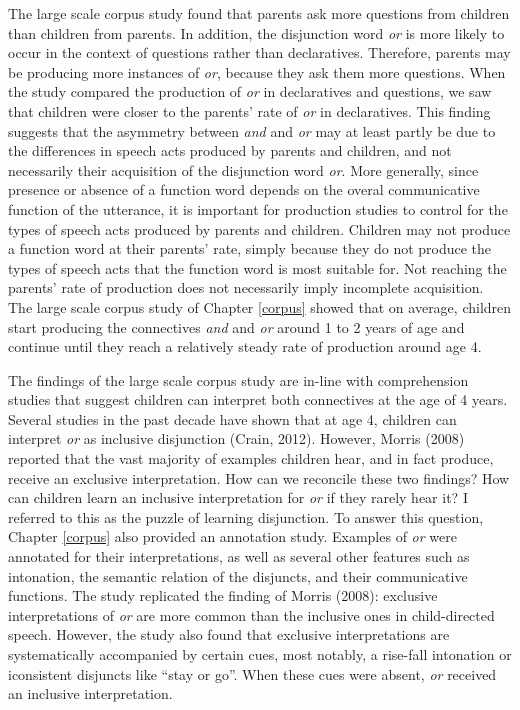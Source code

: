 \documentclass[oneside]{report}
\theoremstyle{definition}
\theoremstyle{definition}
\theoremstyle{definition}
\theoremstyle{remark}
\begin{document}
The large scale corpus study found that parents ask more questions from
children than children from parents. In addition, the disjunction word
\emph{or} is more likely to occur in the context of questions rather
than declaratives. Therefore, parents may be producing more instances of
\emph{or}, because they ask them more questions. When the study compared
the production of \emph{or} in declaratives and questions, we saw that
children were closer to the parents' rate of \emph{or} in declaratives.
This finding suggests that the asymmetry between \emph{and} and
\emph{or} may at least partly be due to the differences in speech acts
produced by parents and children, and not necessarily their acquisition
of the disjunction word \emph{or}. More generally, since presence or
absence of a function word depends on the overal communicative function
of the utterance, it is important for production studies to control for
the types of speech acts produced by parents and children. Children may
not produce a function word at their parents' rate, simply because they
do not produce the types of speech acts that the function word is most
suitable for. Not reaching the parents' rate of production does not
necessarily imply incomplete acquisition. The large scale corpus study
of Chapter \ref{corpus} showed that on average, children start producing
the connectives \emph{and} and \emph{or} around 1 to 2 years of age and
continue until they reach a relatively steady rate of production around
age 4.

The findings of the large scale corpus study are in-line with
comprehension studies that suggest children can interpret both
connectives at the age of 4 years. Several studies in the past decade
have shown that at age 4, children can interpret \emph{or} as inclusive
disjunction (Crain, 2012). However, Morris (2008) reported that the vast
majority of examples children hear, and in fact produce, receive an
exclusive interpretation. How can we reconcile these two findings? How
can children learn an inclusive interpretation for \emph{or} if they
rarely hear it? I referred to this as the puzzle of learning
disjunction. To answer this question, Chapter \ref{corpus} also provided
an annotation study. Examples of \emph{or} were annotated for their
interpretations, as well as several other features such as intonation,
the semantic relation of the disjuncts, and their communicative
functions. The study replicated the finding of Morris (2008): exclusive
interpretations of \emph{or} are more common than the inclusive ones in
child-directed speech. However, the study also found that exclusive
interpretations are systematically accompanied by certain cues, most
notably, a rise-fall intonation or iconsistent disjuncts like ``stay or
go''. When these cues were absent, \emph{or} received an inclusive
interpretation.
\end{document}

